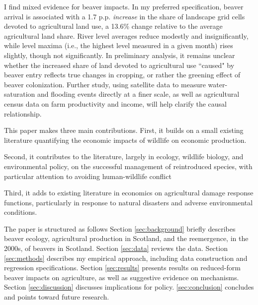 I find mixed evidence for beaver impacts. In my preferred specification, beaver arrival is associated with a 1.7 p.p. \textit{increase} in the share of landscape grid cells devoted to agricultural land use, a 13.6\% change relative to the average agricultural land share. River level averages reduce modestly and insignificantly, while level maxima (i.e., the highest level measured in a given month) rises slightly, though not significantly. In preliminary analysis, it remains unclear whether the increased share of land devoted to agricultural use ``caused" by beaver entry reflects true changes in cropping, or rather the greening effect of beaver colonization. Further study, using satellite data to measure water-saturation and flooding events directly at a finer scale, as well as agricultural census data on farm productivity and income, will help clarify the causal relationship.

This paper makes three main contributions. First, it builds on a small existing literature quantifying the economic impacts of wildlife on economic production.

Second, it contributes to the literature, largely in ecology, wildlife biology, and environmental policy, on the successful management of reintroduced species, with particular attention to avoiding human-wildlife conflict

Third, it adds to existing literature in economics on agricultural damage response functions, particularly in response to natural disasters and adverse environmental conditions.

The paper is structured as follows Section \ref{sec:background} briefly describes beaver ecology, agricultural production in Scotland, and the reemergence, in the 2000s, of beavers in Scotland. Section \ref{sec:data} reviews the data. Section \ref{sec:methods} describes my empirical approach, including data construction and regression specifications. Section \ref{sec:results} presents results on reduced-form beaver impacts on agriculture, as well as suggestive evidence on mechanisms. Section \ref{sec:discussion} discusses implications for policy. \ref{sec:conclusion} concludes and points toward future research. 

